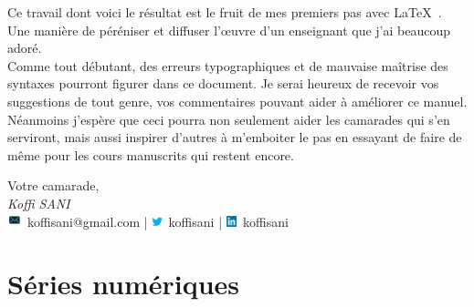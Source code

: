 \documentclass[11pt, a4paper]{book}
\begin{document}
 Ce travail dont voici le r\'esultat est le fruit de mes premiers pas avec \LaTeX\ . Une manière de péréniser et diffuser l'\oe uvre d'un enseignant que j'ai beaucoup adoré.\\
 
 Comme tout d\'ebutant, des erreurs typographiques et de mauvaise ma\^itrise des syntaxes pourront figurer dans ce document. Je serai heureux de recevoir vos suggestions de tout genre, vos commentaires pouvant aider \`a am\'eliorer ce manuel. N\'eanmoins j'esp\`ere que ceci pourra non seulement aider les camarades qui s'en serviront, mais aussi inspirer d'autres \`a m'emboiter le pas en essayant de faire de m\^eme pour les cours manuscrits qui restent encore. \\
\begin{flushright}
Votre camarade,\\
\vspace{1cm}
\emph{Koffi SANI } \\ \includegraphics[width=0.4cm]{mail}\ koffisani@gmail.com |  \includegraphics[width=0.3cm]{twitter}\ koffisani | \includegraphics[width=0.3cm]{in}\ koffisani
\end{flushright}
\tableofcontents
\setcounter{tocdepth}{3}
\newcommand{\ud}{\mathrm{d}}
\newcommand{\lo}{\mathrm{Log}}
\newcommand{\arct}{\mathrm{Arctan}}
\chapter{S\'eries num\'eriques}
\end{document}
